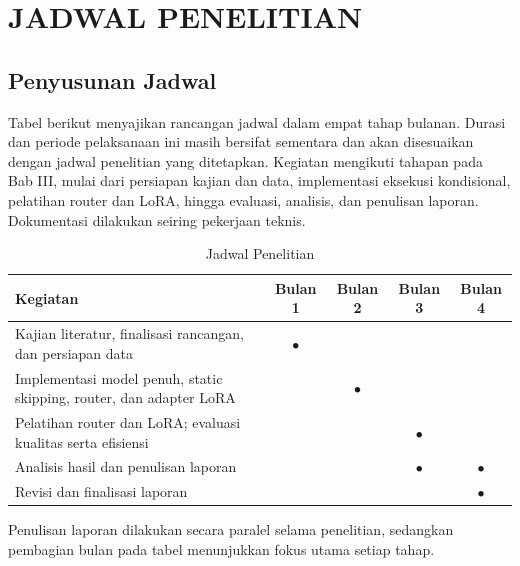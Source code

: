 \chapter{JADWAL PENELITIAN}

\section{Penyusunan Jadwal}

Tabel berikut menyajikan rancangan jadwal dalam empat tahap bulanan. Durasi dan periode pelaksanaan ini masih bersifat sementara dan akan disesuaikan dengan jadwal penelitian yang ditetapkan. Kegiatan mengikuti tahapan pada Bab III, mulai dari persiapan kajian dan data, implementasi eksekusi kondisional, pelatihan router dan LoRA, hingga evaluasi, analisis, dan penulisan laporan. Dokumentasi dilakukan seiring pekerjaan teknis.

\begin{table}[H]
  \centering
  \caption{Jadwal Penelitian}
  \begin{tabular}{|p{}|c|c|c|c|}
    \hline
    \textbf{Kegiatan} & \textbf{Bulan 1} & \textbf{Bulan 2} & \textbf{Bulan 3} & \textbf{Bulan 4} \\
    \hline
    Kajian literatur, finalisasi rancangan, dan persiapan data & $\bullet$ & & & \\
    \hline
    Implementasi model penuh, static skipping, router, dan adapter LoRA & & $\bullet$ & & \\
    \hline
    Pelatihan router dan LoRA; evaluasi kualitas serta efisiensi & & & $\bullet$ & \\
    \hline
    Analisis hasil dan penulisan laporan & & & $\bullet$ & $\bullet$ \\
    \hline
    Revisi dan finalisasi laporan & & & & $\bullet$ \\
    \hline
  \end{tabular}
\end{table}

Penulisan laporan dilakukan secara paralel selama penelitian, sedangkan pembagian bulan pada tabel menunjukkan fokus utama setiap tahap.
